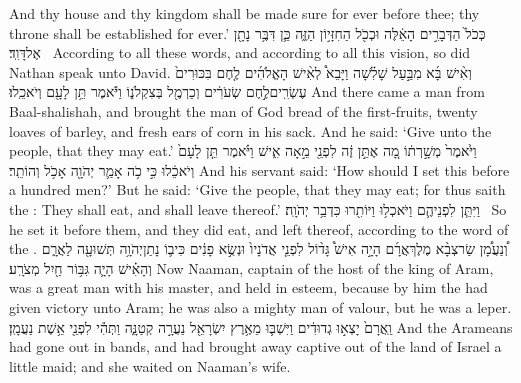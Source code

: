 {And thy house and thy kingdom shall be made sure for ever before thee; thy throne shall be established for ever.’}
{כְּכֹל֙ הַדְּבָרִ֣ים הָאֵ֔לֶּה וּכְכֹ֖ל הַחִזָּי֣וֹן הַזֶּ֑ה כֵּ֛ן דִּבֶּ֥ר נָתָ֖ן אֶל\maqqaf דָּוִֽד׃ \petucha }
{According to all these words, and according to all this vision, so did Nathan speak unto David.}
\newperek
{}
\label{haft_27}
\setcounter{chap}{4}
\setcounter{verse}{42}
{וְאִ֨ישׁ בָּ֜א מִבַּ֣עַל שָׁלִ֗שָׁה וַיָּבֵא֩ לְאִ֨ישׁ הָאֱלֹהִ֜ים לֶ֤חֶם בִּכּוּרִים֙ עֶשְׂרִֽים\maqqaf לֶ֣חֶם שְׂעֹרִ֔ים וְכַרְמֶ֖ל בְּצִקְלֹנ֑וֹ וַיֹּ֕אמֶר תֵּ֥ן לָעָ֖ם וְיֹאכֵֽלוּ׃}
{And there came a man from Baal-shalishah, and brought the man of God bread of the first-fruits, twenty loaves of barley, and fresh ears of corn in his sack. And he said: ‘Give unto the people, that they may eat.’}
{וַיֹּ֙אמֶר֙ מְשָׁ֣רְת֔וֹ מָ֚ה אֶתֵּ֣ן זֶ֔ה לִפְנֵ֖י מֵ֣אָה אִ֑ישׁ וַיֹּ֗אמֶר תֵּ֤ן לָעָם֙ וְיֹאכֵ֔לוּ כִּ֣י כֹ֥ה אָמַ֛ר יְהֹוָ֖ה אָכֹ֥ל וְהוֹתֵֽר׃}
{And his servant said: ‘How should I set this before a hundred men?’ But he said: ‘Give the people, that they may eat; for thus saith the \lord: They shall eat, and shall leave thereof.’}
{וַיִּתֵּ֧ן לִפְנֵיהֶ֛ם וַיֹּאכְל֥וּ וַיּוֹתִ֖רוּ כִּדְבַ֥ר יְהֹוָֽה׃ \petucha }
{So he set it before them, and they did eat, and left thereof, according to the word of the \lord.}
\newperek
{}
{וְ֠נַעֲמָ֠ן שַׂר\maqqaf צְבָ֨א מֶלֶךְ\maqqaf אֲרָ֜ם הָיָ֣ה אִישׁ֩ גָּד֨וֹל לִפְנֵ֤י אֲדֹנָיו֙ וּנְשֻׂ֣א פָנִ֔ים כִּי\maqqaf ב֛וֹ נָתַן\maqqaf יְהֹוָ֥ה תְּשׁוּעָ֖ה לַאֲרָ֑ם וְהָאִ֗ישׁ הָיָ֛ה גִּבּ֥וֹר חַ֖יִל מְצֹרָֽע׃}
{Now Naaman, captain of the host of the king of Aram, was a great man with his master, and held in esteem, because by him the \lord\space had given victory unto Aram; he was also a mighty man of valour, but he was a leper.}
{וַֽאֲרָם֙ יָצְא֣וּ גְדוּדִ֔ים וַיִּשְׁבּ֛וּ מֵאֶ֥רֶץ יִשְׂרָאֵ֖ל נַעֲרָ֣ה קְטַנָּ֑ה וַתְּהִ֕י לִפְנֵ֖י אֵ֥שֶׁת נַעֲמָֽן׃}
{And the Arameans had gone out in bands, and had brought away captive out of the land of Israel a little maid; and she waited on Naaman’s wife.}
